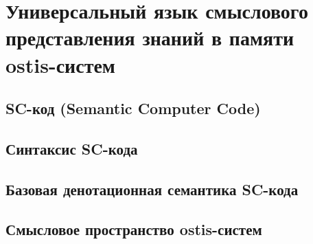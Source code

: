 \chapter{Универсальный язык смыслового представления знаний в памяти ostis-систем}
\label{chapter_sc_code}


\section{SC-код (Semantic Computer Code)}
\section{Синтаксис SC-кода}
\section{Базовая денотационная семантика SC-кода}
\section{Смысловое пространство ostis-систем}

%